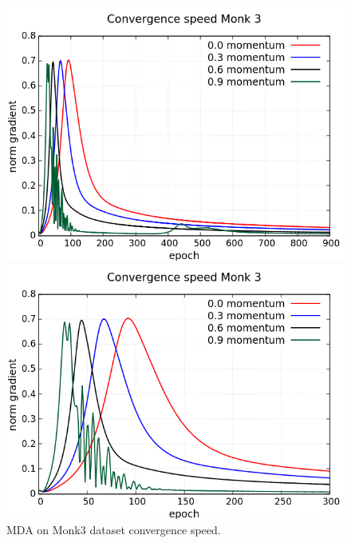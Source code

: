 \begin{figure}[H]
	\centering
	\begin{minipage}[t]{0.5\linewidth}
		\includegraphics[width=\linewidth]{data/MGD/Monk3/M/Monk3_MGD_CS_standard.png}
	\end{minipage}%
	\begin{minipage}[t]{0.5\linewidth}
		\includegraphics[width=\linewidth]{data/MGD/Monk3/M/Monk3_MGD_CS_zoom.png}
	\end{minipage}
	\caption{MDA on Monk3 dataset convergence speed.}
\end{figure}
